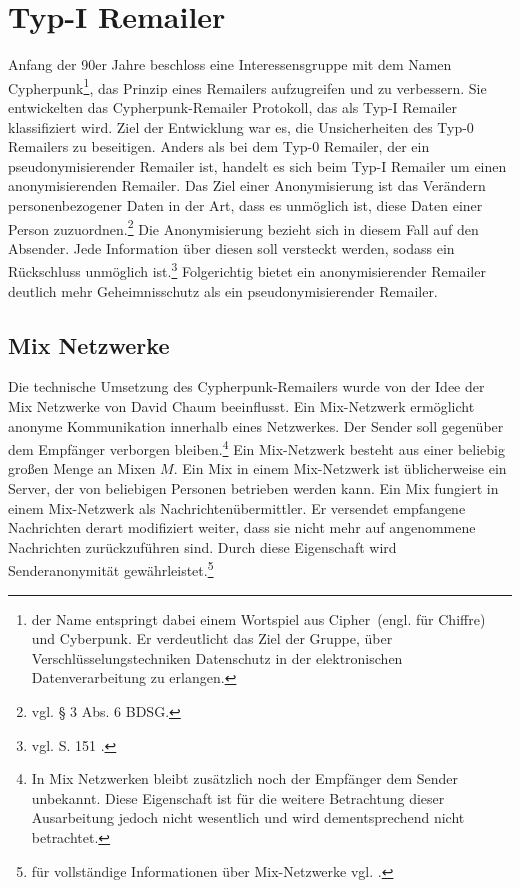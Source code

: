 \chapter{Typ-I Remailer}
Anfang der 90er Jahre beschloss eine Interessensgruppe mit dem Namen \glqq Cypherpunk\footnote{der Name entspringt dabei einem Wortspiel aus \glqq Cipher\grqq ~(engl. für Chiffre) und \glqq Cyberpunk\grqq. Er verdeutlicht das Ziel der Gruppe, über Verschlüsselungstechniken Datenschutz in der elektronischen Datenverarbeitung zu erlangen.}\grqq, das Prinzip eines Remailers aufzugreifen und zu verbessern. Sie entwickelten das Cypherpunk-Remailer Protokoll, das als Typ-I Remailer klassifiziert wird. Ziel der Entwicklung war es, die Unsicherheiten des Typ-0 Remailers zu beseitigen.
Anders als bei dem Typ-0 Remailer, der ein pseudonymisierender Remailer ist, handelt es sich beim Typ-I Remailer um einen anonymisierenden Remailer. Das Ziel einer Anonymisierung ist das Verändern personenbezogener Daten in der Art, dass es unmöglich ist, diese Daten einer Person zuzuordnen.\footnote {vgl. § 3 Abs. 6 BDSG.}
Die Anonymisierung bezieht sich in diesem Fall auf den Absender. Jede Information über diesen soll versteckt werden, sodass ein Rückschluss unmöglich ist.\footnote{vgl. S. 151 \cite{horster2013datenschutz}.} Folgerichtig bietet ein anonymisierender Remailer deutlich mehr Geheimnisschutz als ein pseudonymisierender Remailer. 


\section{Mix Netzwerke}
Die technische Umsetzung des Cypherpunk-Remailers wurde von der Idee der Mix Netzwerke von David Chaum beeinflusst. Ein Mix-Netzwerk ermöglicht anonyme Kommunikation innerhalb eines Netzwerkes. Der Sender soll gegenüber dem Empfänger verborgen bleiben.\footnote{In Mix Netzwerken bleibt zusätzlich noch der Empfänger dem Sender unbekannt. Diese Eigenschaft ist für die weitere Betrachtung dieser Ausarbeitung jedoch nicht wesentlich und wird dementsprechend nicht betrachtet.}
Ein Mix-Netzwerk besteht aus einer beliebig großen Menge an Mixen \(M\). Ein Mix in einem Mix-Netzwerk ist üblicherweise ein Server, der von beliebigen Personen betrieben werden kann. Ein Mix fungiert in einem Mix-Netzwerk als Nachrichtenübermittler. Er versendet empfangene Nachrichten derart modifiziert weiter, dass sie nicht mehr auf angenommene Nachrichten zurückzuführen sind. Durch diese Eigenschaft wird Senderanonymität gewährleistet.\footnote{für vollständige Informationen über Mix-Netzwerke vgl.  \cite{chaum1981}.}

